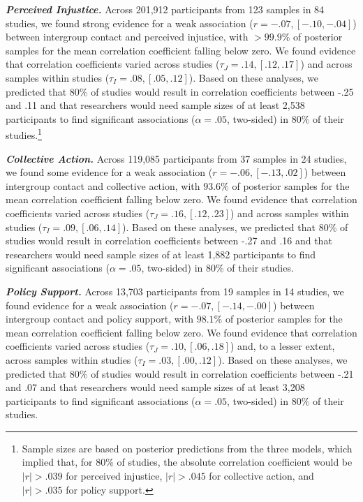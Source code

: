 \documentclass[twocolumn, 11pt, letterpaper]{article}
\begin{document}
\textbf{\emph{Perceived Injustice.}} Across 201,912 participants from
123 samples in 84 studies, we found strong evidence for a weak
association (\(r = -.07, [-.10, -.04]\)) between intergroup contact and
perceived injustice, with \(>99.9\%\) of posterior samples for the mean
correlation coefficient falling below zero. We found evidence that
correlation coefficients varied across studies
(\(\tau_J = .14, [.12, .17]\)) and across samples within studies
(\(\tau_I = .08, [.05, .12]\)). Based on these analyses, we predicted
that 80\% of studies would result in correlation coefficients between
-.25 and .11 and that researchers would need sample sizes of at least
2,538 participants to find significant associations (\(\alpha = .05\),
two-sided) in 80\% of their studies.\footnote{Sample sizes are based on
  posterior predictions from the three models, which implied that, for
  80\% of studies, the absolute correlation coefficient would be
  \(|r| > .039\) for perceived injustice, \(|r| > .045\) for collective
  action, and \(|r| > .035\) for policy support.}

\textbf{\emph{Collective Action.}} Across 119,085 participants from 37
samples in 24 studies, we found some evidence for a weak association
(\(r = -.06, [-.13, .02]\)) between intergroup contact and collective
action, with \(93.6\%\) of posterior samples for the mean correlation
coefficient falling below zero. We found evidence that correlation
coefficients varied across studies (\(\tau_J = .16, [.12, .23]\)) and
across samples within studies (\(\tau_I = .09, [.06, .14]\)). Based on
these analyses, we predicted that 80\% of studies would result in
correlation coefficients between -.27 and .16 and that researchers would
need sample sizes of at least 1,882 participants to find significant
associations (\(\alpha = .05\), two-sided) in 80\% of their studies.

\textbf{\emph{Policy Support.}} Across 13,703 participants from 19
samples in 14 studies, we found evidence for a weak association
(\(r = -.07, [-.14, -.00]\)) between intergroup contact and policy
support, with \(98.1\%\) of posterior samples for the mean correlation
coefficient falling below zero. We found evidence that correlation
coefficients varied across studies (\(\tau_J = .10, [.06, .18]\)) and,
to a lesser extent, across samples within studies
(\(\tau_I = .03, [.00, .12]\)). Based on these analyses, we predicted
that 80\% of studies would result in correlation coefficients between
-.21 and .07 and that researchers would need sample sizes of at least
3,208 participants to find significant associations (\(\alpha = .05\),
two-sided) in 80\% of their studies.
\end{document}
